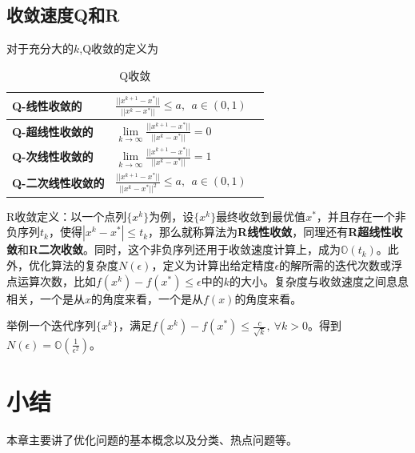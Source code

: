 \documentclass{article}
\begin{document}
\subsection{收敛速度Q和R}
对于充分大的$k$,Q收敛的定义为
\begin{table}[h]
    \centering
    \caption{Q收敛}
    \begin{tabular}{|l|l|l|}\hline
        \textbf{Q-线性收敛的}    &  $ \frac{||x^{k+1}-x^*||}{||x^{k}-x^*||} \le a,\ \ a \in (0,1)$\\ \hline
        \textbf{Q-超线性收敛的}  & $ \lim\limits_{k \rightarrow \infty}\frac{||x^{k+1}-x^*||}{||x^{k}-x^*||} =0$  \\ \hline
        \textbf{Q-次线性收敛的} &  $\lim\limits_{k \rightarrow \infty}\frac{||x^{k+1}-x^*||}{||x^{k}-x^*||} =1$\\ \hline 
        \textbf{Q-二次线性收敛的} &  $ \frac{||x^{k+1}-x^*||}{||x^{k}-x^*||^2} \le a,\ \ a \in (0,1)$\\ \hline 
    \end{tabular}
\end{table}

R收敛定义：以一个点列$\{x^k\}$为例，设$\{x^k\}$最终收敛到最优值$x^*$，并且存在一个非负序列$t_k$，使得$|x^k-x^*| \le t_k$，那么就称算法为\textbf{R线性收敛}，同理还有\textbf{R超线性收敛}和\textbf{R二次收敛}。同时，这个非负序列还用于收敛速度计算上，成为$\mathbb{O}(t_k)$。此外，优化算法的复杂度$N(\epsilon)$，定义为计算出给定精度$\epsilon$的解所需的迭代次数或浮点运算次数，比如$f(x^k)-f(x^*) \le \epsilon$中的$k$的大小。复杂度与收敛速度之间息息相关，一个是从$x$的角度来看，一个是从$f(x)$的角度来看。

举例一个迭代序列$\{x^k\}$，满足$f(x^k)-f(x^*) \le \frac{c}{\sqrt{k}}, \ \forall k>0 $。得到$N(\epsilon)=\mathbb{O}(\frac{1}{\epsilon^2})$。

\section{小结}
本章主要讲了优化问题的基本概念以及分类、热点问题等。
\end{document}
